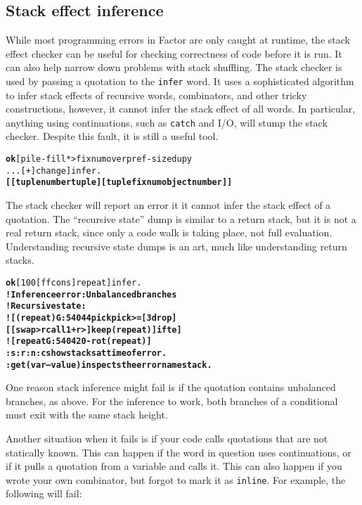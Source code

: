 \documentclass{report}
\begin{document}
\subsection{Stack effect inference}

While most programming errors in Factor are only caught at runtime, the stack effect checker can be useful for checking correctness of code before it is run. It can also help narrow down problems with stack shuffling. The stack checker is used by passing a quotation to the \texttt{infer} word. It uses a sophisticated algorithm to infer stack effects of recursive words, combinators, and other tricky constructions, however, it cannot infer the stack effect of all words. In particular, anything using continuations, such as \texttt{catch} and I/O, will stump the stack checker. Despite this fault, it is still a useful tool.

\begin{alltt}
\textbf{ok} [ pile-fill * >fixnum over pref-size dup y
\texttt{...} [ + ] change ] infer .
\textbf{[ [ tuple number tuple ] [ tuple fixnum object number ] ]}
\end{alltt}

The stack checker will report an error it it cannot infer the stack effect of a quotation. The ``recursive state'' dump is similar to a return stack, but it is not a real return stack, since only a code walk is taking place, not full evaluation. Understanding recursive state dumps is an art, much like understanding return stacks.

\begin{alltt}
\textbf{ok} [ 100 [ f f cons ] repeat ] infer .
\textbf{! Inference error: Unbalanced branches
! Recursive state:
! [ (repeat) G:54044 pick pick >= [ 3drop ]
    [ [ swap >r call 1 + r> ] keep (repeat) ] ifte ]
! [ repeat G:54042 0 -rot (repeat) ]
:s :r :n :c show stacks at time of error.
:get ( var -- value ) inspects the error namestack.}
\end{alltt}

One reason stack inference might fail is if the quotation contains unbalanced branches, as above. For the inference to work, both branches of a conditional must exit with the same stack height.

Another situation when it fails is if your code calls quotations that are not statically known. This can happen if the word in question uses continuations, or if it pulls a quotation from a variable and calls it. This can also happen if you wrote your own combinator, but forgot to mark it as \texttt{inline}. For example, the following will fail:
\end{document}
